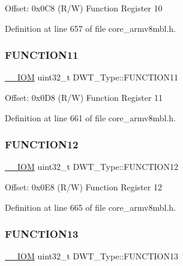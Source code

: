 Offset\+: 0x0\+C8 (R/W) Function Register 10 

Definition at line 657 of file core\+\_\+armv8mbl.\+h.

\mbox{\label{struct_d_w_t___type_a214f7478184150e43175c05aecad6c96}} 
\subsubsection{\texorpdfstring{F\+U\+N\+C\+T\+I\+O\+N11}{FUNCTION11}}
{\footnotesize\ttfamily \hyperlink{core__sc300_8h_ab6caba5853a60a17e8e04499b52bf691}{\+\_\+\+\_\+\+I\+OM} uint32\+\_\+t D\+W\+T\+\_\+\+Type\+::\+F\+U\+N\+C\+T\+I\+O\+N11}

Offset\+: 0x0\+D8 (R/W) Function Register 11 

Definition at line 661 of file core\+\_\+armv8mbl.\+h.

\mbox{\label{struct_d_w_t___type_a521771b3dfe2ea48463e1e91d01448b6}} 
\subsubsection{\texorpdfstring{F\+U\+N\+C\+T\+I\+O\+N12}{FUNCTION12}}
{\footnotesize\ttfamily \hyperlink{core__sc300_8h_ab6caba5853a60a17e8e04499b52bf691}{\+\_\+\+\_\+\+I\+OM} uint32\+\_\+t D\+W\+T\+\_\+\+Type\+::\+F\+U\+N\+C\+T\+I\+O\+N12}

Offset\+: 0x0\+E8 (R/W) Function Register 12 

Definition at line 665 of file core\+\_\+armv8mbl.\+h.

\mbox{\label{struct_d_w_t___type_af9ea0b56769614c5c5699003b3df39f0}} 
\subsubsection{\texorpdfstring{F\+U\+N\+C\+T\+I\+O\+N13}{FUNCTION13}}
{\footnotesize\ttfamily \hyperlink{core__sc300_8h_ab6caba5853a60a17e8e04499b52bf691}{\+\_\+\+\_\+\+I\+OM} uint32\+\_\+t D\+W\+T\+\_\+\+Type\+::\+F\+U\+N\+C\+T\+I\+O\+N13}

